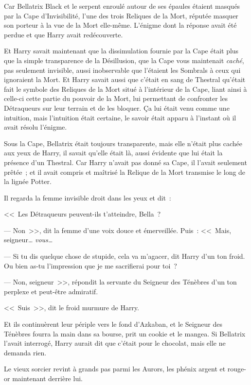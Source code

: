 Car Bellatrix Black et le serpent enroulé autour de ses épaules étaient masqués par la Cape d'Invisibilité, l'une des trois Reliques de la Mort, réputée masquer son porteur à la vue de la Mort elle-même. L'énigme dont la réponse avait été perdue et que Harry avait redécouverte.

Et Harry savait maintenant que la dissimulation fournie par la Cape était plus que la simple transparence de la Désillusion, que la Cape vous maintenait \emph{caché}, pas seulement invisible, aussi inobservable que l'étaient les Sombrals à ceux qui ignoraient la Mort. Et Harry savait aussi que c'était en sang de Thestral qu'était fait le symbole des Reliques de la Mort situé à l'intérieur de la Cape, liant ainsi à celle-ci cette partie du pouvoir de la Mort, lui permettant de confronter les Détraqueurs sur leur terrain et de les bloquer. Ça lui était venu comme une intuition, mais l'intuition était certaine, le savoir était apparu à l'instant où il avait résolu l'énigme.

Sous la Cape, Bellatrix était toujours transparente, mais elle n'était plus cachée aux yeux de Harry, il savait qu'elle était là, aussi évidente que lui était la présence d'un Thestral. Car Harry n'avait pas donné sa Cape, il l'avait seulement prêtée~; et il avait compris et maîtrisé la Relique de la Mort transmise le long de la lignée Potter.

Il regarda la femme invisible droit dans les yeux et dit~:

<<~Les Détraqueurs peuvent-ils t'atteindre, Bella~?

--- Non~>>, dit la femme d'une voix douce et émerveillée. Puis~: <<~Mais, seigneur… \emph{vous…}

--- Si tu dis quelque chose de stupide, cela va m'agacer, dit Harry d'un ton froid. Ou bien as-tu l'impression que je me sacrifierai pour toi~?

--- Non, seigneur~>>, répondit la servante du Seigneur des Ténèbres d'un ton perplexe et peut-être admiratif.

<<~Suis~>>, dit le froid murmure de Harry.

Et ils continuèrent leur périple vers le fond d'Azkaban, et le Seigneur des Ténèbres fourra la main dans sa bourse, prit un cookie et le mangea. Si Bellatrix l'avait interrogé, Harry aurait dit que c'était pour le chocolat, mais elle ne demanda rien.

\later

Le vieux sorcier revint à grands pas parmi les Aurors, les phénix argent et rouge-or maintenant derrière lui.

